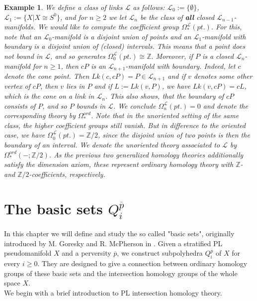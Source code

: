 \documentclass[11pt]{book}
\newtheorem{example}{Example}
\begin{document}
\begin{example}
We define a class of links $\mathcal{L}$ as follows: $\mathcal{L}_0 := \{ \emptyset \}$, $\mathcal{L}_1 := \{ X|X \cong S^0 \}$, and for $n \geq 2$ we let $\mathcal{L}_n$ be the class of \textbf{all} closed $\mathcal{L}_{n-1}$-manifolds. We would like to compute the coefficient group $\Omega_*^{\mathcal{L}}(pt.)$. For this, note that an $\mathcal{L}_0$-manifold is a disjoint union of points and an $\mathcal{L}_1$-manifold with boundary is a disjoint union of (closed) intervals. This means that a point does not bound in $\mathcal{L}$, and so generates 
$\Omega_0^{\mathcal{L}}(pt.) \cong \mathbb{Z}.$ Moreover, if $P$ is a closed $\mathcal{L}_n$-manifold for $n \geq 1$, then $cP$ is an $\mathcal{L}_{n+1}$-manifold with boundary. Indeed, let $c$ denote the cone point. Then $Lk(c,cP)=P \in \mathcal{L}_{n+1}$ and if $v$ denotes some other vertex of $cP$, then $v$ lies in $P$ and if $L:=Lk(v,P)$, we have $Lk(v,cP)=cL$, which is the cone on a link in $\mathcal{L}_n$. This also shows, that the boundary of $cP$ consists of $P$, and so $P$ bounds in $\mathcal{L}$. We conclude $\Omega_n^{\mathcal{L}}(pt.)=0$ and denote the corresponding theory by $\Omega_*^{ord}$. Note that in the unoriented setting of the same class, the higher coefficient groups still vanish. But in difference to the oriented case, we have $\Omega_0^{\underline{\mathcal{L}}}(pt.)= \mathbb{Z}/2$, since the disjoint union of two points is then the boundary of an interval. We denote the unoriented theory associated to $\mathcal{L}$ by $\Omega_*^{ord}(-; \mathbb{Z}/2)$. As the previous two generalized homology theories additionally satisfy the dimension axiom, these represent ordinary homology theory with $\mathbb{Z}$- and $\mathbb{Z}/2$-coefficients, respectively.
\end{example}

\chapter{The basic sets $Q_i^{\overline{p}}$}
In this chapter we will define and study the so called "basic sets", originally introduced by M. Goresky and R. McPherson in \cite{GM}. Given a stratified PL pseudomanifold $X$ and a perversity $\overline{p}$, we construct subpolyhedra $Q_i^{\overline{p}}$ of $X$ for every $i \geq 0$. They are designed to give a connection between ordinary homology groups of these basic sets and the intersection homology groups of the whole space $X$. \\
We begin with a brief introduction to PL intersection homology theory.
\end{document}
